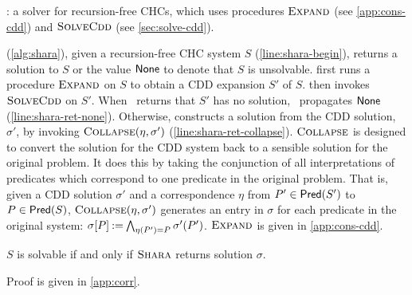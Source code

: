 \begin{algorithm}[t]
  \caption{\sys: a solver for recursion-free CHCs, which uses
    procedures $\textsc{Expand}{}$ (see \autoref{app:cons-cdd}) and
    $\textsc{SolveCdd}$ (see
    \autoref{sec:solve-cdd}). }
  \label{alg:shara}
\end{algorithm}
\sys (\autoref{alg:shara}), given a recursion-free CHC system $S$
(\autoref{line:shara-begin}), 
returns a solution
to $S$ or the value $\mathsf{None}$ to denote that $S$ is
unsolvable.
%
\sys first runs a procedure $\textsc{Expand}$ on $S$ to obtain a CDD expansion
$S'$ of $S$.
%
\sys then invokes $\textsc{SolveCdd}$ on $S'$.
%
When \solvecdd~returns that $S'$ has
no solution, \sys~propagates $\mathsf{None}$ (\autoref{line:shara-ret-none}).
%
Otherwise, \sys constructs a solution from the CDD solution,
$\sigma'$, by invoking $\textsc{Collapse}( \eta ,  \sigma' )$
(\autoref{line:shara-ret-collapse}).
%
$\textsc{Collapse}$ is designed to convert the solution for the CDD system
back to a sensible solution for the original problem. It does this by
taking the conjunction of all interpretations of predicates which
correspond to one predicate in the original problem.
%
That is, given a CDD solution $\sigma'$ and a correspondence $\eta$ from
$P' \in \mathsf{Pred}( S' )$ to $P \in \mathsf{Pred}( S )$,
$\textsc{Collapse}(\eta, \sigma')$ generates an entry in $\sigma$ for each
predicate in the original system:
$\sigma[P] \mathbin{:=} \bigwedge_{ \eta(P') = P} \sigma'(P')$.
%
$\textsc{Expand}$ is given in \autoref{app:cons-cdd}.

\begin{thm}
  \label{thm:corr}
  $S$ is solvable if and only if $\textsc{Shara}$ returns solution $\sigma$.
\end{thm}
Proof is given in \autoref{app:corr}.

